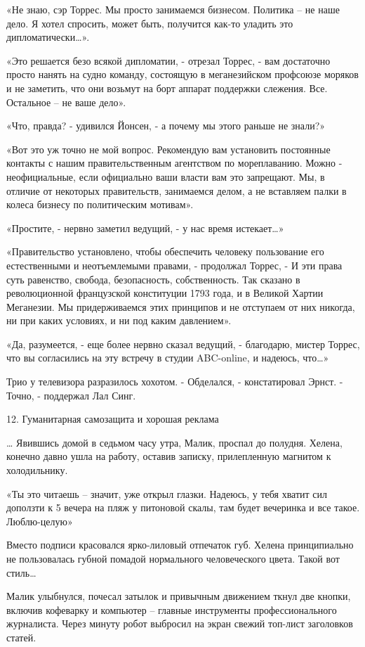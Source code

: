 «Не знаю, сэр Торрес. Мы просто занимаемся бизнесом. Политика – не наше дело. Я хотел спросить, может быть, получится как-то уладить это дипломатически…».

«Это решается безо всякой дипломатии, - отрезал Торрес, - вам достаточно просто нанять на судно команду, состоящую в меганезийском профсоюзе моряков и не заметить, что они возьмут на борт аппарат поддержки слежения. Все. Остальное – не ваше дело».

«Что, правда? - удивился Йонсен, - а почему мы этого раньше не знали?»

«Вот это уж точно не мой вопрос. Рекомендую вам установить постоянные контакты с нашим правительственным агентством по мореплаванию. Можно - неофициальные, если официально ваши власти вам это запрещают. Мы, в отличие от некоторых правительств, занимаемся делом, а не вставляем палки в колеса бизнесу по политическим мотивам».

«Простите, - нервно заметил ведущий, - у нас время истекает…»

«Правительство установлено, чтобы обеспечить человеку пользование его естественными и неотъемлемыми правами, - продолжал Торрес, - И эти права суть равенство, свобода, безопасность, собственность. Так сказано в революционной французской конституции 1793 года, и в Великой Хартии Меганезии. Мы придерживаемся этих принципов и не отступаем от них никогда, ни при каких условиях, и ни под каким давлением».

«Да, разумеется, - еще более нервно сказал ведущий, - благодарю, мистер Торрес, что вы согласились на эту встречу в студии ABC-online, и надеюсь, что…»

Трио у телевизора разразилось хохотом.
- Обделался, - констатировал Эрнст.
- Точно, - поддержал Лал Синг.



12. Гуманитарная самозащита и хорошая реклама


… Явившись домой в седьмом часу утра, Малик, проспал до полудня. Хелена, конечно давно ушла на работу, оставив записку, прилепленную магнитом к холодильнику.

«Ты это читаешь – значит, уже открыл глазки. Надеюсь, у тебя хватит сил доползти к 5 вечера на пляж у питоновой скалы, там будет вечеринка и все такое. Люблю-целую»

Вместо подписи красовался ярко-лиловый отпечаток губ. Хелена принципиально не пользовалась губной помадой нормального человеческого цвета. Такой вот стиль…

Малик улыбнулся, почесал затылок и привычным движением ткнул две кнопки, включив кофеварку и компьютер – главные инструменты профессионального журналиста. Через минуту робот выбросил на экран свежий топ-лист заголовков статей.

